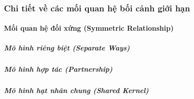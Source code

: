 \documentclass{article} %
\begin{document}
% 


% 


% 


% 


% 


\subsubsection{Chi tiết về các mối quan hệ bối cảnh giới hạn}



\paragraph{Mối quan hệ đối xứng (Symmetric Relationship)}

\subparagraph{Mô hình riêng biệt (Separate Ways)}

% 

\subparagraph{Mô hình hợp tác (Partnership)}

% 

\subparagraph{Mô hình hạt nhân chung (Shared Kernel)}
\end{document}

